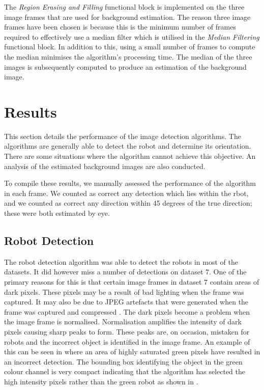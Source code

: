 \documentclass{article}
\begin{document}
The \textit{Region Erasing and Filling} functional block is implemented on the three image frames that are used for background estimation. The reason three image frames have been chosen is because this is the minimum number of frames required to effectively use a median filter which is utilised in the \textit{Median Filtering} functional block. In addition to this, using a small number of frames to compute the median minimises the algorithm's processing time. The median of the three images is subsequently computed to produce an estimation of the background image.

\section{Results}
\label{sec:results}
This section details the performance of the image detection algorithms. The algorithms are generally able to detect the robot and determine its orientation. There are some situations where the algorithm cannot achieve this objective. An analysis of the estimated background images are also conducted.

To compile these results, we manually assessed the performance of the algorithm in each frame. We counted as correct any detection which lies within the rbot, and we counted as correct any direction within 45 degrees of the true direction; these were both estimated by eye.
 
\subsection{Robot Detection}
\label{sec:detect}
The robot detection algorithm was able to detect the robots in most of the datasets.  It did however miss a number of detections on dataset $7$. One of the primary reasons for this is that certain image frames in dataset $7$ contain areas of dark pixels. These pixels may be a result of bad lighting when the frame was captured. It may also be due to JPEG artefacts that were generated when the frame was captured and compressed \cite{ref:digitalprocessing}. The dark pixels become a problem when the image frame is normalised. Normalisation amplifies the intensity of dark pixels causing sharp peaks to form. These peaks are, on occasion, mistaken for robots and the incorrect object is identified in the image frame. An example of this can be seen in  where an area of highly saturated green pixels have resulted in an incorrect detection. The bounding box identifying the object in the green colour channel is very compact indicating that the algorithm has selected the high intensity pixels rather than the green robot as shown in .
\end{document}
